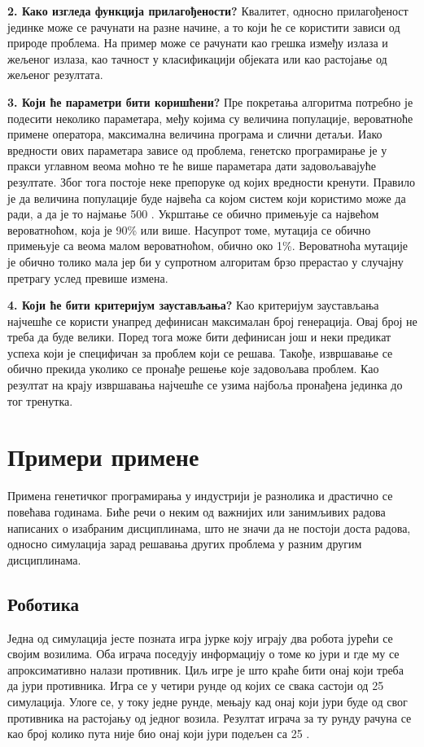 \documentclass[a4paper]{article}
\begin{document}
\textbf{2. Како изгледа функција прилагођености?}\newline
Квалитет, односно прилагођеност јединке може се рачунати на разне начине, а то који ће се користити зависи од природе проблема. На пример може се рачунати као грешка између излаза и жељеног излаза, као тачност у класификацији објеката или као растојање од жељеног резултата.\newline

\textbf{3. Који ће параметри бити коришћени?}\newline
\label{text:parametri}
Пре покретања алгоритма потребно је подесити неколико параметара, међу којима су величина популације, вероватноће примене оператора, максимална величина програма и слични детаљи. Иако вредности ових параметара зависе од проблема, генетско програмирање је у пракси углавном веома моћно те ће више параметара дати задовољавајуће резултате. Због тога постоје неке препоруке од којих вредности кренути. Правило је да величина популације буде највећа са којом систем који користимо може да ради, а да је то најмање 500 \cite{fieldGuidetoGP}. Укрштање се обично примењује са највећом вероватноћом, која је 90\% или више. Насупрот томе, мутација се обично примењује са веома малом вероватноћом, обично око 1\%. Вероватноћа мутације је обично толико мала јер би у супротном алгоритам брзо прерастао у случајну претрагу услед превише измена.\newline

\textbf{4. Који ће бити критеријум заустављања?}\newline
Као критеријум заустављања најчешће се користи унапред дефинисан максималан број генерација. Овај број не треба да буде велики. Поред тога може бити дефинисан још и неки предикат успеха који је специфичан за проблем који се решава. Такође, извршавање се обично прекида уколико се пронађе решење које задовољава проблем. Као резултат на крају извршавања најчешће се узима најбоља пронађена јединка до тог тренутка.

\section{Примери примене}

Примена генетичког програмирања у индустрији је разнолика и драстично се повећава годинама. Биће речи о неким од важнијих или занимљивих радова написаних о изабраним дисциплинама, што не значи да не постоји доста радова, односно симулација зарад решавања других проблема у разним другим дисциплинама.
\subsection{Роботика}
Једна од симулација јесте позната игра јурке коју играју два робота јурећи се својим возилима. Оба играча поседују информацију о томе ко јури и где му се апроксимативно налази противник. Циљ игре је што краће бити онај који треба да јури противника. Игра се у четири рунде од којих се свака састоји од 25 симулација. Улоге се, у току једне рунде, мењају кад онај који јури буде од свог противника на растојању од једног возила. Резултат играча за ту рунду рачуна се као број колико пута није био онај који јури подељен са 25 \cite{tag}.
\end{document}
